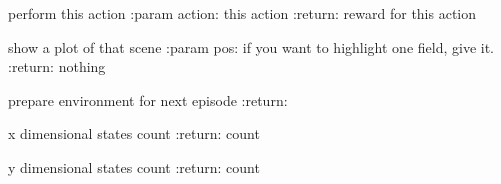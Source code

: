 \documentclass[letterpaper,10pt,english]{sphinxmanual}
\begin{document}
\begin{fulllineitems}

\begin{fulllineitems}
\label{Problems:morl_problems.MORLBuridansAssProblem.play}
perform this action
:param action: this action
:return: reward for this action

\end{fulllineitems}


\begin{fulllineitems}
\label{Problems:morl_problems.MORLBuridansAssProblem.print_map}
show a plot of that scene
:param pos: if you want to highlight one field, give it.
:return: nothing

\end{fulllineitems}


\begin{fulllineitems}
\label{Problems:morl_problems.MORLBuridansAssProblem.reset}
prepare environment for next episode
:return:

\end{fulllineitems}


\begin{fulllineitems}
\label{Problems:morl_problems.MORLBuridansAssProblem.scene_x_dim}
x dimensional states count
:return: count

\end{fulllineitems}


\begin{fulllineitems}
\label{Problems:morl_problems.MORLBuridansAssProblem.scene_y_dim}
y dimensional states count
:return: count

\end{fulllineitems}


\end{fulllineitems}

\end{document}
